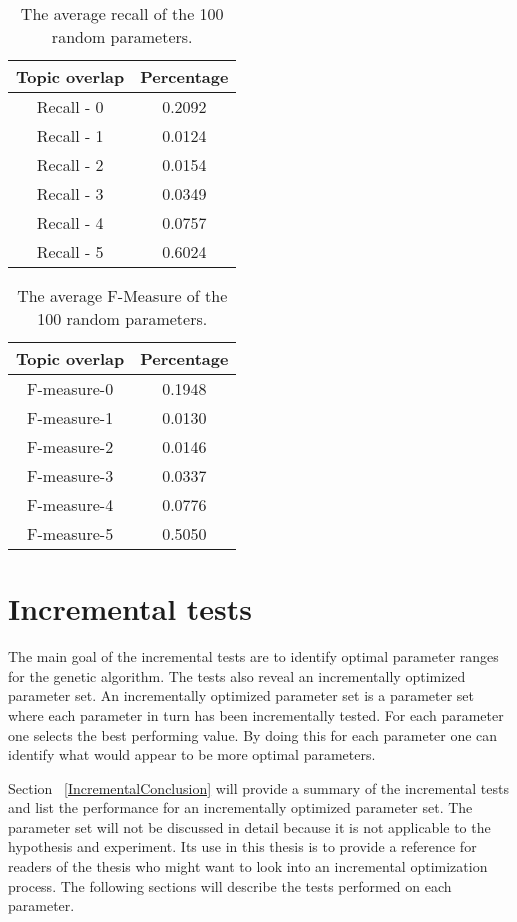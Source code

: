 \begin{table}[H]
\begin{center}
\begin{tabular}{|c|c|}
\hline
Topic overlap & Percentage\\ 
\hline
Recall - 0 & 0.2092\\
Recall - 1 & 0.0124\\
Recall - 2 & 0.0154\\
Recall - 3 & 0.0349\\
Recall - 4 & 0.0757\\
Recall - 5 & 0.6024\\
\hline
\end{tabular}
\end{center}
\caption{The average recall of the 100 random parameters.}
\label{tab:randomparamsrecall}
\end{table}

\begin{table}[H]
\begin{center}
\begin{tabular}{|c|c|}
\hline
Topic overlap & Percentage\\ 
\hline
F-measure-0 & 0.1948\\
F-measure-1 & 0.0130\\
F-measure-2 & 0.0146\\
F-measure-3 & 0.0337\\
F-measure-4 & 0.0776\\
F-measure-5 & 0.5050\\
\hline
\end{tabular}
\end{center}
\caption{The average F-Measure of the 100 random parameters.}
\label{tab:randomparamsfmeasure}
\end{table}


\section{Incremental tests}

The main goal of the incremental tests are to identify optimal parameter ranges for the genetic algorithm. The tests also reveal an incrementally optimized parameter set. An incrementally optimized parameter set is a parameter set where each parameter in turn has been incrementally tested. For each parameter one selects the best performing value. By doing this for each parameter one can identify what would appear to be more optimal parameters.

Section ~\ref{IncrementalConclusion} will provide a summary of the incremental tests and list the performance for an incrementally optimized parameter set. The parameter set will not be discussed in detail because it is not applicable to the hypothesis and experiment. Its use in this thesis is to provide a reference for readers of the thesis who might want to look into an incremental optimization process. The following sections will describe the tests performed on each parameter.

